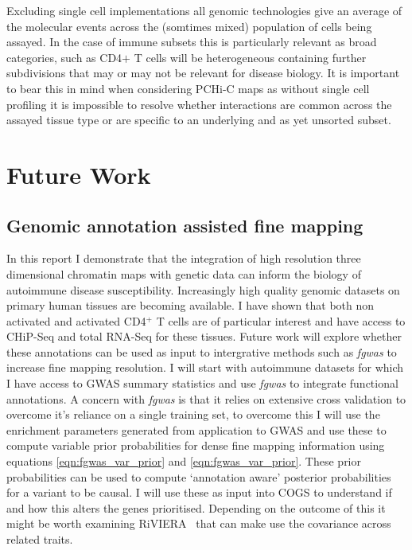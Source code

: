 \documentclass[a4paper,11pt]{report}
\begin{document}
Excluding single cell implementations all genomic technologies give an average of the molecular events across the (somtimes mixed) population of cells being assayed. In the case of immune subsets this is particularly relevant as broad categories, such as CD4$+$ T cells will be heterogeneous containing further subdivisions that may or may not be relevant for disease biology. It is important to bear this in mind when considering PCHi-C maps as without single cell profiling it is impossible to resolve whether interactions are common across the assayed tissue type or are specific to an underlying and as yet unsorted subset.

\chapter{Future Work}

\section{Genomic annotation assisted fine mapping} 
In this report I demonstrate that the integration of high resolution three dimensional chromatin maps with genetic data can inform the biology of autoimmune disease susceptibility. Increasingly high quality genomic datasets on primary human tissues are becoming available. I have shown that both non activated and activated CD4$^{+}$ T cells are of particular interest and  have access to CHiP-Seq and total RNA-Seq for these tissues. Future work will explore whether these annotations can be used as input to intergrative methods such as \textit{fgwas} to increase fine mapping resolution. I will start with autoimmune datasets for which I have access to GWAS summary statistics and use \textit{fgwas} to integrate functional annotations. A concern with \textit{fgwas} is that it relies on extensive cross validation to overcome it's reliance on a single training set, to overcome this I will use the enrichment parameters generated from application to GWAS and use these to compute variable prior probabilities for dense fine mapping information using equations \ref{eqn:fgwas_var_prior} and \ref{eqn:fgwas_var_prior}. These  prior probabilities can be used to compute `annotation aware' posterior probabilities for a variant to be causal. I will use these as input into COGS to understand if and how this alters the genes prioritised. Depending on the outcome of this it might be worth examining RiVIERA~\citep{LiKellis2016} that can make use the covariance across related traits.
\end{document}
